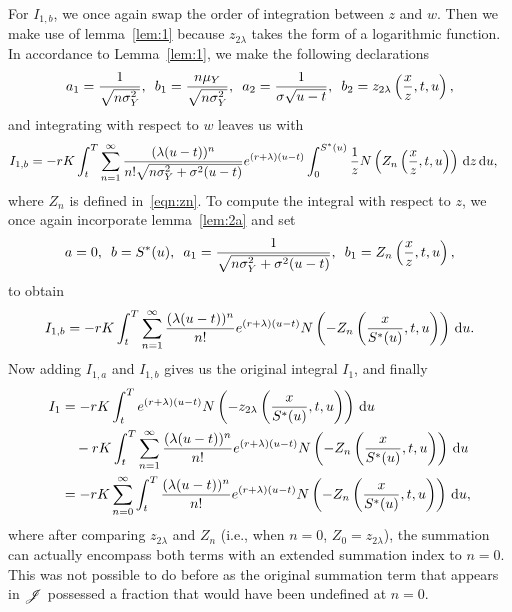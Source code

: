         	For $I_{1,b}$, we once again swap the order of integration between $z$ and $w$. Then we make use of lemma~\ref{lem:1} because $z_{2\lambda}$ takes the form of a logarithmic function. In accordance to Lemma~\ref{lem:1}, we make the following declarations
        		$$
        			a_1 = \frac{1}{\sqrt{n\sigma_Y^2}}, \enskip b_1 = \frac{n\mu_Y}{\sqrt{n\sigma_Y^2}}, \enskip
        			a_2 = \frac{1}{\sigma\sqrt{u-t}}, \enskip b_2 = z_{2\lambda}\left( \frac{x}{z}, t, u\right),
        		$$
	and integrating with respect to $w$ leaves us with
			\begin{align*}
				I_{1,b} &= -rK  \int_t^T  \displaystyle\sum\limits_{n=1}^{\infty} \frac{(\lambda(u-t))^n}{n!\sqrt{n\sigma_Y^2 + \sigma^2(u-t)}}  e^{(r+\lambda)(u-t)} \int_0^{S^*(u)} \frac{1}{z}  N\left(Z_n \left( \frac{x}{z},t,u  \right) \right) \,\mathrm d z \, \mathrm d u,
			\end{align*}
	where $Z_n$ is defined in~\eqref{eqn:zn}. To compute the integral with respect to $z$, we once again incorporate lemma~\ref{lem:2a} and set 
		$$
			a = 0, \enskip b = S^*(u), \enskip a_1 = \frac{1}{\sqrt{n\sigma_Y^2 + \sigma^2(u-t)}}, \enskip
			b_1 = Z_n\left( \frac{x}{z}, t, u \right),
		$$
		to obtain
		$$
			I_{1,b} = -rK  \int_t^T  \displaystyle\sum\limits_{n=1}^{\infty} \frac{(\lambda(u-t))^n}{n!}  e^{(r+\lambda)(u-t)} N\left(- Z_n \left( \frac{x}{S^*(u)},t,u  \right) \right) \, \mathrm d u.
		$$
		Now adding $I_{1,a}$ and $I_{1,b}$ gives us the original integral $I_1$, and finally
		\begin{align}
			I_1 &= -rK\int_t^T e^{(r+\lambda)(u-t)}N\left(-z_{2\lambda}\left( \frac{x}{S^*(u)},t,u\right) \right) \, \mathrm d u \nonumber \\
			 &\quad -rK  \int_t^T  \displaystyle\sum\limits_{n=1}^{\infty} \frac{(\lambda(u-t))^n}{n!}  e^{(r+\lambda)(u-t)} N\left(- Z_n \left( \frac{x}{S^*(u)},t,u  \right) \right) \, \mathrm d u \nonumber \\
			 &= -rK \displaystyle\sum\limits_{n=0}^{\infty}\int_t^T  \frac{(\lambda(u-t))^n}{n!} e^{(r+\lambda)(u-t)} N\left(-Z_n \left( \frac{x}{S^*(u)},t,u  \right) \right) \, \mathrm d u, \label{eqn:I1put}
		\end{align}
		where after comparing $z_{2\lambda}$ and $Z_n$ (i.e., when $n=0$, $Z_0 = z_{2\lambda}$), the summation can actually encompass both terms with an extended summation index to $n=0$. This was not possible to do before as the original summation term that appears in $\mathscr J$ possessed a fraction that would have been undefined at $n=0$.
		
